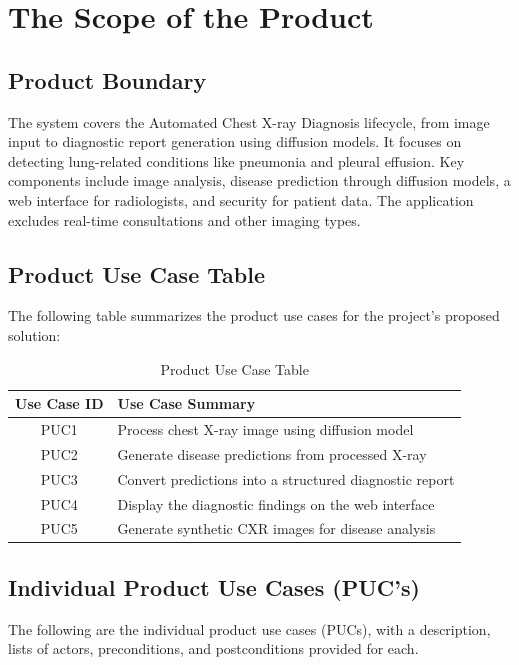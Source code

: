 \documentclass[12pt]{article}
\begin{document}
\section{The Scope of the Product}
\subsection{Product Boundary}
The system covers the Automated Chest X-ray Diagnosis lifecycle, from image input to diagnostic report generation using diffusion models. It focuses on detecting lung-related conditions like pneumonia and pleural effusion. Key components include image analysis, disease prediction through diffusion models, a web interface for radiologists, and security for patient data. The application excludes real-time consultations and other imaging types.

\subsection{Product Use Case Table}
The following table summarizes the product use cases for the project's proposed solution:

\begin{table}[h!]
    \centering
    \caption{Product Use Case Table}
    \begin{tabular}{|c|p{12cm}|}
        \hline
        \textbf{Use Case ID} & \textbf{Use Case Summary} \\
        \hline
        PUC1 & Process chest X-ray image using diffusion model \\
        \hline
        PUC2 & Generate disease predictions from processed X-ray \\
        \hline
        PUC3 & Convert predictions into a structured diagnostic report \\
        \hline
        PUC4 & Display the diagnostic findings on the web interface \\
        \hline
        PUC5 & Generate synthetic CXR images for disease analysis \\
        \hline
    \end{tabular}
\end{table}
\subsection{Individual Product Use Cases (PUC's)}
The following are the individual product use cases (PUCs), with a description, lists of actors, preconditions, and postconditions provided for each.
\end{document}
